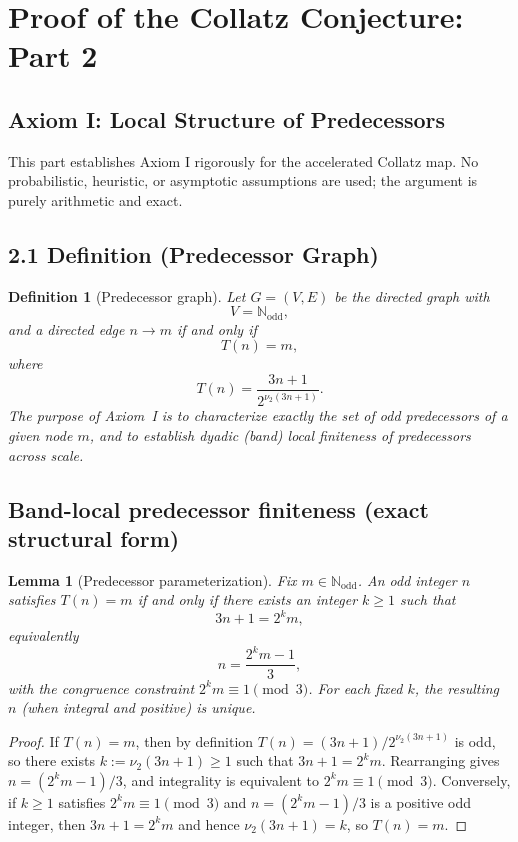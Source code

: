 \documentclass[preprint,12pt]{elsarticle}
\newtheorem{lemma}{Lemma}
\newtheorem{definition}{Definition}
\begin{document}
\section{Proof of the Collatz Conjecture: Part 2}
\subsection{Axiom I: Local Structure of Predecessors}
This part establishes Axiom I rigorously for the accelerated Collatz map. No probabilistic, heuristic, or asymptotic assumptions are used; the argument is purely arithmetic and exact.

\subsection{2.1 Definition (Predecessor Graph)}
\begin{definition}[Predecessor graph]
Let \(G=(V,E)\) be the directed graph with
\[
V = \mathbb{N}_{\mathrm{odd}},
\]
and a directed edge \(n \to m\) if and only if
\[
T(n) = m,
\]
where
\[
T(n) = \frac{3n+1}{2^{\nu_2(3n+1)}}.
\]
The purpose of Axiom~I is to characterize exactly the set of odd predecessors of a given node $m$, and to establish dyadic (band) local finiteness of predecessors across scale.
\end{definition}


\subsection{Band-local predecessor finiteness (exact structural form)}\label{subsec:band_local_predecessors}

\begin{lemma}[Predecessor parameterization]\label{lem:predecessor_parameterization}
Fix $m\in\mathbb{N}_{\mathrm{odd}}$. An odd integer $n$ satisfies $T(n)=m$ if and only if there exists an integer $k\ge 1$ such that
\[
3n+1 = 2^k m,
\]
equivalently
\[
n = \frac{2^k m - 1}{3},
\]
with the congruence constraint $2^k m\equiv 1\pmod 3$. For each fixed $k$, the resulting $n$ (when integral and positive) is unique.
\end{lemma}

\begin{proof}
If $T(n)=m$, then by definition $T(n)=(3n+1)/2^{\nu_2(3n+1)}$ is odd, so there exists $k:=\nu_2(3n+1)\ge 1$ such that $3n+1=2^k m$.
Rearranging gives $n=(2^k m-1)/3$, and integrality is equivalent to $2^k m\equiv 1\pmod 3$.
Conversely, if $k\ge 1$ satisfies $2^k m\equiv 1\pmod 3$ and $n=(2^k m-1)/3$ is a positive odd integer, then $3n+1=2^k m$ and hence $\nu_2(3n+1)=k$, so $T(n)=m$.
\end{proof}
\end{document}
